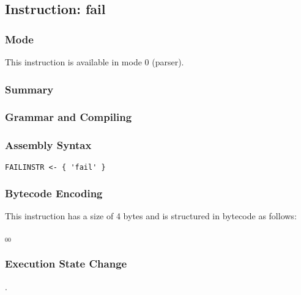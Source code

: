 \subsection{Instruction: fail}

\subsubsection{Mode}
This instruction is available in mode 0 (parser).
\subsubsection{Summary}


\subsubsection{Grammar and Compiling}


\subsubsection{Assembly Syntax}

\begin{myquote}
\begin{verbatim}
FAILINSTR <- { 'fail' }
\end{verbatim}
\end{myquote}

\subsubsection{Bytecode Encoding}

This instruction has a size of 4 bytes and is structured in bytecode as follows:

$_{00}$\ 

\subsubsection{Execution State Change}

.


